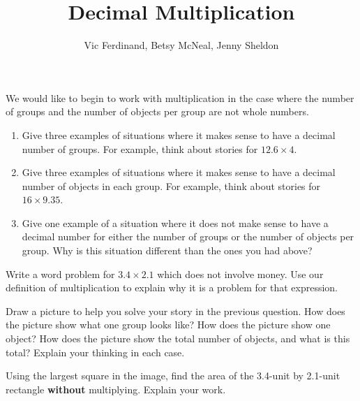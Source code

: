 \documentclass[nooutcomes,noauthor,handout]{ximera}
\title{Decimal Multiplication}
\author{Vic Ferdinand, Betsy McNeal, Jenny Sheldon}
\begin{document}
\begin{abstract}  \end{abstract}
\maketitle


\begin{problem}
We would like to begin to work with multiplication in the case where the number of groups and the number of objects per group are not whole numbers.

\begin{enumerate}
\item Give three examples of situations where it makes sense to have a decimal number of groups. For example, think about stories for $12.6 \times 4$.
\item Give three examples of situations where it makes sense to have a decimal number of objects in each group. For example, think about stories for $16 \times 9.35$.
\item Give one example of a situation where it does not make sense to have a decimal number for either the number of groups or the number of objects per group. Why is this situation different than the ones you had above?
\end{enumerate}
\end{problem}


\begin{problem}
Write a word problem for $3.4 \times 2.1$ which does not involve money. Use our definition of multiplication to explain why it is a problem for that expression.
\end{problem}


\begin{problem}
Draw a picture to help you solve your story in the previous question. How does the picture show what one group looks like? How does the picture show one object? How does the picture show the total number of objects, and what is this total? Explain your thinking in each case.
\end{problem}

\newpage

\begin{problem}
Using the largest square in the image, find the area of the 3.4-unit by 2.1-unit rectangle {\bf without} multiplying. Explain your work.

\begin{image}
\end{image}
\end{problem}
\end{document}
